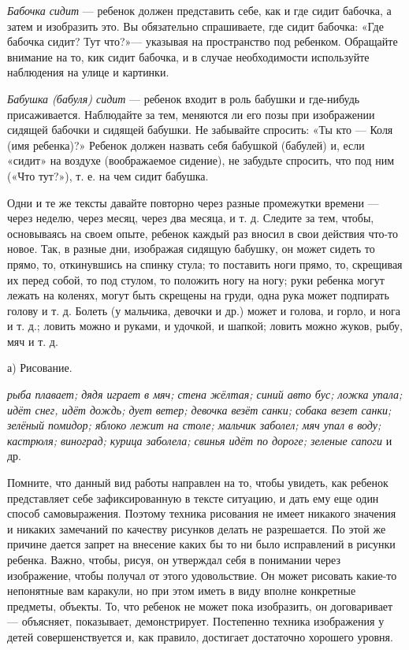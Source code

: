 \documentclass[a5paper]{book}
\renewcommand{\emph}[1]{\textit{#1}}
\begin{document}
\emph{Бабочка сидит} --- ребенок должен представить себе, как и где
сидит бабочка, а затем и изобразить это. Вы обязательно спрашиваете, где
сидит бабочка: «Где бабочка сидит? Тут что?»--- указывая на пространство
под ребенком. Обращайте внимание на то, кик сидит бабочка, и в случае
необходимости используйте наблюдения на улице и картинки.

\emph{Бабушка (бабуля) сидит} --- ребенок входит в роль бабушки и
где-нибудь присаживается. Наблюдайте за тем, меняются ли его позы при
изображении сидящей бабочки и сидящей бабушки. Не забывайте спросить:
«Ты кто --- Коля (имя ребенка)?» Ребенок должен назвать себя бабушкой
(бабулей) и, если «сидит» на воздухе (воображаемое сидение), не забудьте
спросить, что под ним («Что тут?»), т. е. на чем сидит бабушка.

Одни и те же тексты давайте повторно через разные промежутки времени ---
через неделю, через месяц, через два месяца, и т. д. Следите за тем,
чтобы, основываясь на своем опыте, ребенок каждый раз вносил в свои
действия что-то новое. Так, в разные дни, изображая сидящую бабушку, он
может сидеть то прямо, то, откинувшись на спинку стула; то поставить
ноги прямо, то, скрещивая их перед собой, то под стулом, то положить
ногу на ногу; руки ребенка могут лежать на коленях, могут быть скрещены
на груди, одна рука может подпирать голову и т. д. Болеть (у мальчика,
девочки и др.) может и голова, и горло, и нога и т. д.; ловить можно и
руками, и удочкой, и шапкой; ловить можно жуков, рыбу, мяч и т. д.

а) Рисование.

\emph{рыба плавает; дядя играет в мяч; стена жёлтая; синий авто бус;
ложка упала; идёт снег, идёт дождь; дует ветер; девочка везёт санки;
собака везет санки; зелёный помидор; яблоко лежит на столе; мальчик
заболел; мяч упал в воду; кастрюля; виноград; курица заболела; свинья
идёт по дороге; зеленые сапоги} и др.

Помните, что данный вид работы направлен на то, чтобы увидеть, как
ребенок представляет себе зафиксированную в тексте ситуацию, и дать ему
еще один способ самовыражения. Поэтому техника рисования не имеет
никакого значения и никаких замечаний по качеству рисунков делать не
разрешается. По этой же причине дается запрет на внесение каких бы то ни
было исправлений в рисунки ребенка. Важно, чтобы, рисуя, он утверждал
себя в понимании через изображение, чтобы получал от этого удовольствие.
Он может рисовать какие-то непонятные вам каракули, но при этом иметь в
виду вполне конкретные предметы, объекты. То, что ребенок не может пока
изобразить, он договаривает --- объясняет, показывает, демонстрирует.
Постепенно техника изображения у детей совершенствуется и, как правило,
достигает достаточно хорошего уровня.
\end{document}
